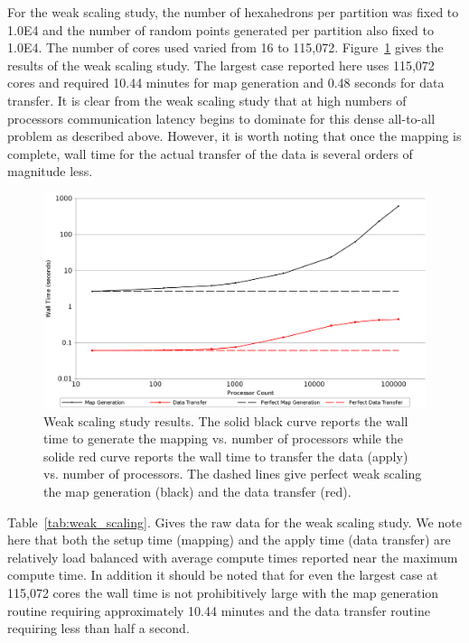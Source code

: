\documentclass{mc2013}
\begin{document}
\label{subsec:weak_scaling}
For the weak scaling study, the number of hexahedrons per partition
was fixed to 1.0E4 and the number of random points generated per
partition also fixed to 1.0E4. The number of cores used varied from 16
to 115,072. Figure~\ref{fig:weak_scaling} gives the results of the
weak scaling study. The largest case reported here uses 115,072 cores
and required 10.44 minutes for map generation and 0.48 seconds for
data transfer. It is clear from the weak scaling study that at high
numbers of processors communication latency begins to dominate for
this dense all-to-all problem as described above. However, it is worth
noting that once the mapping is complete, wall time for the actual
transfer of the data is several orders of magnitude less.

\begin{figure}[ht!]
  \centering
  \includegraphics[width=5.5in]{WeakScaling.png}
  \caption{Weak scaling study results. The solid black curve reports
    the wall time to generate the mapping vs. number of processors
    while the solide red curve reports the wall time to transfer the
    data (apply) vs. number of processors. The dashed lines give
    perfect weak scaling the map generation (black) and the data
    transfer (red).}
  \label{fig:weak_scaling}
\end{figure}

Table~\ref{tab:weak_scaling}. Gives the raw data for the weak scaling
study. We note here that both the setup time (mapping) and the apply
time (data transfer) are relatively load balanced with average compute
times reported near the maximum compute time. In addition it should be
noted that for even the largest case at 115,072 cores the wall time is
not prohibitively large with the map generation routine requiring
approximately 10.44 minutes and the data transfer routine requiring
less than half a second.
\end{document}
